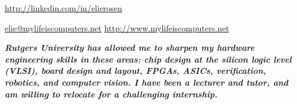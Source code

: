 \documentclass[10pt,a4paper]{article}
\begin{document}
\sloppy %

\centerline{\noindent\href{http://www.linkedin.com/in/elierosen}{http://linkedin.com/in/elierosen}}

\nobreakvspace{0.3em} %

\noindent\href{mailto:elie@mylifeiscomputers.net}{elie\mbox{}@\mbox{}mylifeiscomputers.net} \hfill \href{http://www.mylifeiscomputers.net}{http://www.mylifeiscomputers.net} \\

\spacedhrule{-0.6em}{-0.4em} %

\headedsection
{\textbf{\emph{\small{Rutgers University has allowed me to sharpen my hardware engineering skills in these areas: chip design at the silicon logic level (VLSI), board design and layout, FPGAs, ASICs, verification, robotics, and computer vision. I have been a lecturer and tutor, and am willing to relocate for a challenging internship.} }}}


\spacedhrule{0.6em}{-0.4em}


	
		{}

		{}
\end{document}
